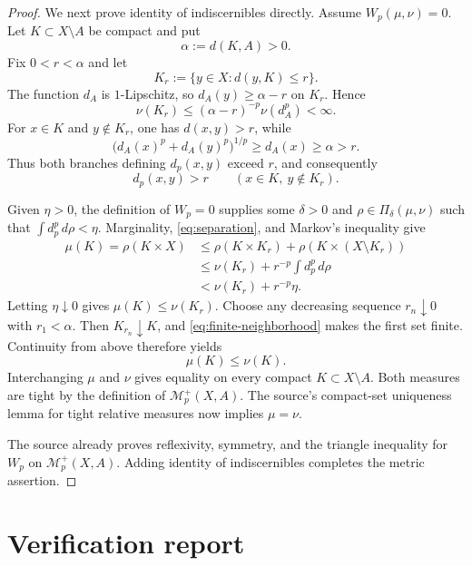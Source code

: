 \documentclass[11pt]{article}
\newcommand{\M}{\mathcal M}
\newcommand{\PiD}{\Pi_{\delta}}
\newcommand{\dd}{\,d}
\begin{document}
\begin{proof}
We next prove identity of indiscernibles directly.  Assume
$W_p(\mu,\nu)=0$.  Let $K\subset X\setminus A$ be compact and put
\[
        \alpha:=d(K,A)>0.
\]
Fix $0<r<\alpha$ and let
\[
        K_r:=\{y\in X:d(y,K)\leq r\}.
\]
The function $d_A$ is $1$-Lipschitz, so
$d_A(y)\geq\alpha-r$ on $K_r$.  Hence
\begin{equation}
       \nu(K_r)\leq(\alpha-r)^{-p}\nu(d_A^p)<\infty. \label{eq:finite-neighborhood}
\end{equation}
For $x\in K$ and $y\notin K_r$, one has $d(x,y)>r$, while
\[
 \bigl(d_A(x)^p+d_A(y)^p\bigr)^{1/p}
       \geq d_A(x)\geq\alpha>r.
\]
Thus both branches defining $d_p(x,y)$ exceed $r$, and consequently
\begin{equation}
       d_p(x,y)>r \label{eq:separation}
       \qquad(x\in K,\ y\notin K_r).
\end{equation}

Given $\eta>0$, the definition of $W_p=0$ supplies some $\delta>0$ and
$\rho\in\PiD(\mu,\nu)$ such that
$\int d_p^p\dd\rho<\eta$.  Marginality, \eqref{eq:separation}, and Markov's inequality give
\begin{align*}
 \mu(K)=\rho(K\times X)
 &\leq \rho(K\times K_r)+\rho(K\times(X\setminus K_r))\\
 &\leq \nu(K_r)+r^{-p}\int d_p^p\dd\rho\\
 &<\nu(K_r)+r^{-p}\eta.
\end{align*}
Letting $\eta\downarrow0$ gives $\mu(K)\leq\nu(K_r)$.
Choose any decreasing sequence $r_n\downarrow0$ with $r_1<\alpha$.
Then $K_{r_n}\downarrow K$, and \eqref{eq:finite-neighborhood} makes the first set finite.  Continuity
from above therefore yields
\[
                  \mu(K)\leq\nu(K).
\]
Interchanging $\mu$ and $\nu$ gives equality on every compact
$K\subset X\setminus A$.  Both measures are tight by the definition of
$\M_p^+(X,A)$.  The source's compact-set uniqueness lemma for tight relative
measures now implies $\mu=\nu$.

The source already proves reflexivity, symmetry, and the triangle inequality
for $W_p$ on $\M_p^+(X,A)$.  Adding identity of indiscernibles completes the
metric assertion.
\end{proof}

\section{Verification report}
\end{document}
